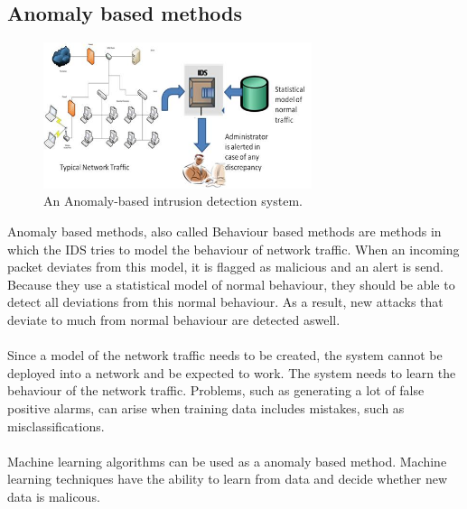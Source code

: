 \subsection{Anomaly based methods}
\begin{figure}[H]
\centering
\includegraphics[width=0.7\textwidth]{Figures/Anomaly-based-Intrusion-Detection-System}
\decoRule
\caption[Anomaly based IDS]{An Anomaly-based intrusion detection system.}
\label{fig:Signature}
\end{figure}
\noindent Anomaly based methods, also called Behaviour based methods are methods in which the IDS tries to model the behaviour of network traffic. When an incoming packet deviates from this model, it is flagged as malicious and an alert is send. Because they use a statistical model of normal behaviour, they should be able to detect all deviations from this normal behaviour. As a result, new attacks that deviate to much from normal behaviour are detected aswell. \\
\\
Since a model of the network traffic needs to be created, the system cannot be deployed into a network and be expected to work. The system needs to learn the behaviour of the network traffic. Problems, such as generating a lot of false positive alarms, can arise when training data includes mistakes, such as misclassifications. \\
\\
Machine learning algorithms can be used as a anomaly based method. Machine learning techniques have the ability to learn from data and decide whether new data is malicous. 
